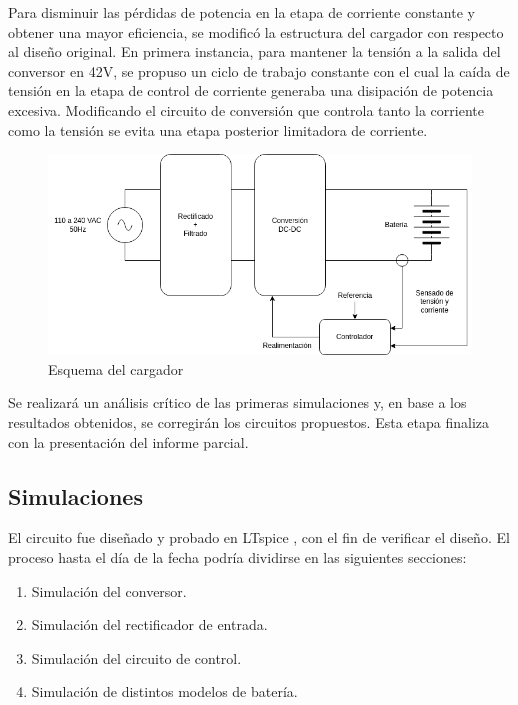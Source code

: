Para disminuir las pérdidas de potencia en la etapa de corriente constante y obtener una mayor eficiencia, se modificó la estructura del cargador con respecto al diseño original. 
En primera instancia, para mantener la tensión a la salida del conversor en 42V, se propuso un ciclo de trabajo constante 
con el cual la caída de tensión en la etapa de control de corriente generaba una disipación de potencia excesiva.
Modificando el circuito de conversión que controla tanto la corriente como la tensión se evita una etapa posterior limitadora de corriente.

\begin{figure}
    \centering
    \includegraphics[width=\textwidth]{images/esquema_cargador_v2.png}
    \caption{Esquema del cargador}
    \label{fig:esquema_cargador}
\end{figure}

Se realizará un análisis crítico de las primeras simulaciones y, en base a los resultados obtenidos, 
se corregirán los circuitos propuestos. 
Esta etapa finaliza con la presentación del informe parcial. 

\subsection{Simulaciones}
El circuito fue diseñado y probado en LTspice \cite{ltspice}, con el fin de verificar el diseño.
El proceso hasta el día de la fecha podría dividirse en las siguientes secciones:
\begin{enumerate}
    \item Simulación del conversor.
    \item Simulación del rectificador de entrada.
    \item Simulación del circuito de control.
    \item Simulación de distintos modelos de batería.
\end{enumerate}

